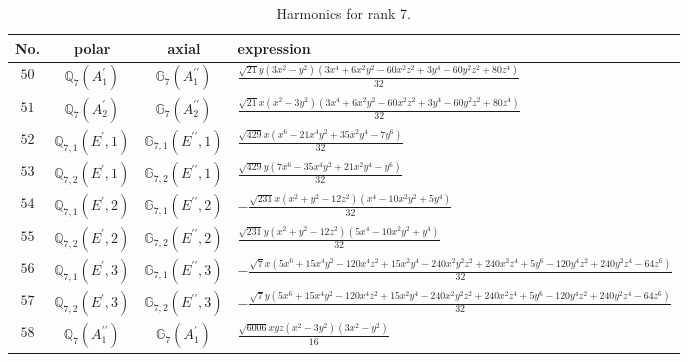\documentclass[fleqn,8pt,landscape]{jsarticle}
\begin{document}
\begin{table}[ht!]
\begin{center}
\caption{Harmonics for rank 7.}
\renewcommand{\arraystretch}{1.3}
\begin{tabular}{cccl} \hline \hline
No. & polar & axial & expression \\ \hline
$ 50 $ & $ \mathbb{Q}_{7}(A_{1}^{\prime}) $ & $ \mathbb{G}_{7}(A_{1}^{\prime\prime}) $ & $ \frac{\sqrt{21} y \left(3 x^{2} - y^{2}\right) \left(3 x^{4} + 6 x^{2} y^{2} - 60 x^{2} z^{2} + 3 y^{4} - 60 y^{2} z^{2} + 80 z^{4}\right)}{32} $ \\
$ 51 $ & $ \mathbb{Q}_{7}(A_{2}^{\prime}) $ & $ \mathbb{G}_{7}(A_{2}^{\prime\prime}) $ & $ \frac{\sqrt{21} x \left(x^{2} - 3 y^{2}\right) \left(3 x^{4} + 6 x^{2} y^{2} - 60 x^{2} z^{2} + 3 y^{4} - 60 y^{2} z^{2} + 80 z^{4}\right)}{32} $ \\
$ 52 $ & $ \mathbb{Q}_{7,1}(E^{\prime},1) $ & $ \mathbb{G}_{7,1}(E^{\prime\prime},1) $ & $ \frac{\sqrt{429} x \left(x^{6} - 21 x^{4} y^{2} + 35 x^{2} y^{4} - 7 y^{6}\right)}{32} $ \\
$ 53 $ & $ \mathbb{Q}_{7,2}(E^{\prime},1) $ & $ \mathbb{G}_{7,2}(E^{\prime\prime},1) $ & $ \frac{\sqrt{429} y \left(7 x^{6} - 35 x^{4} y^{2} + 21 x^{2} y^{4} - y^{6}\right)}{32} $ \\
$ 54 $ & $ \mathbb{Q}_{7,1}(E^{\prime},2) $ & $ \mathbb{G}_{7,1}(E^{\prime\prime},2) $ & $ - \frac{\sqrt{231} x \left(x^{2} + y^{2} - 12 z^{2}\right) \left(x^{4} - 10 x^{2} y^{2} + 5 y^{4}\right)}{32} $ \\
$ 55 $ & $ \mathbb{Q}_{7,2}(E^{\prime},2) $ & $ \mathbb{G}_{7,2}(E^{\prime\prime},2) $ & $ \frac{\sqrt{231} y \left(x^{2} + y^{2} - 12 z^{2}\right) \left(5 x^{4} - 10 x^{2} y^{2} + y^{4}\right)}{32} $ \\
$ 56 $ & $ \mathbb{Q}_{7,1}(E^{\prime},3) $ & $ \mathbb{G}_{7,1}(E^{\prime\prime},3) $ & $ - \frac{\sqrt{7} x \left(5 x^{6} + 15 x^{4} y^{2} - 120 x^{4} z^{2} + 15 x^{2} y^{4} - 240 x^{2} y^{2} z^{2} + 240 x^{2} z^{4} + 5 y^{6} - 120 y^{4} z^{2} + 240 y^{2} z^{4} - 64 z^{6}\right)}{32} $ \\
$ 57 $ & $ \mathbb{Q}_{7,2}(E^{\prime},3) $ & $ \mathbb{G}_{7,2}(E^{\prime\prime},3) $ & $ - \frac{\sqrt{7} y \left(5 x^{6} + 15 x^{4} y^{2} - 120 x^{4} z^{2} + 15 x^{2} y^{4} - 240 x^{2} y^{2} z^{2} + 240 x^{2} z^{4} + 5 y^{6} - 120 y^{4} z^{2} + 240 y^{2} z^{4} - 64 z^{6}\right)}{32} $ \\
$ 58 $ & $ \mathbb{Q}_{7}(A_{1}^{\prime\prime}) $ & $ \mathbb{G}_{7}(A_{1}^{\prime}) $ & $ \frac{\sqrt{6006} x y z \left(x^{2} - 3 y^{2}\right) \left(3 x^{2} - y^{2}\right)}{16} $ \\

\end{tabular}
\end{center}
\end{table}
\end{document}
